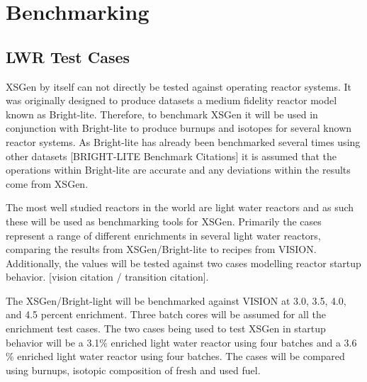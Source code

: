 \documentclass{article}
\begin{document}
\section{Benchmarking}
\subsection{LWR Test Cases}
XSGen by itself can not directly be tested against operating reactor systems. It was originally designed to produce datasets a medium fidelity reactor model known as Bright-lite. Therefore, to benchmark XSGen it will be used in conjunction with Bright-lite to produce burnups and isotopes for several known reactor systems.  As Bright-lite has already been benchmarked several times using other datasets [BRIGHT-LITE Benchmark Citations] it is assumed that the operations within Bright-lite are accurate and any deviations within the results come from XSGen. 

The most well studied reactors in the world are light water reactors and as such these will be used as benchmarking tools for XSGen. Primarily the cases represent a range of different enrichments in several light water reactors, comparing the results from XSGen/Bright-lite to recipes from VISION. Additionally, the values will be tested against two cases modelling reactor startup behavior.  [vision citation / transition citation].

The XSGen/Bright-light will be benchmarked against VISION at 3.0, 3.5, 4.0, and 4.5 percent enrichment. Three batch cores will be assumed for all the enrichment test cases. 
The two cases being used to test XSGen in startup behavior will be a 3.1$\%$ enriched light water reactor using four batches and a 3.6$\%$ enriched light water reactor using four batches. The cases will be compared using burnups, isotopic composition of fresh and used fuel.
\end{document}
